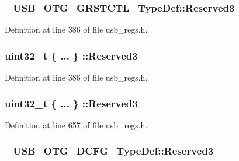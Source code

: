 \hypertarget{group___u_s_b___o_t_g___d_r_i_v_e_r_ga3ddb35024f1d6b9df8699e9471afda72}{
\subsubsection[{Reserved3}]{ \-\_\-\-U\-S\-B\-\_\-\-O\-T\-G\-\_\-\-G\-R\-S\-T\-C\-T\-L\-\_\-\-Type\-Def\-::\-Reserved3}}\label{group___u_s_b___o_t_g___d_r_i_v_e_r_ga3ddb35024f1d6b9df8699e9471afda72}


Definition at line 386 of file usb\-\_\-regs.\-h.

\hypertarget{group___u_s_b___o_t_g___d_r_i_v_e_r_gad0aeec0db612eae030b65cc000f7817a}{
\subsubsection[{Reserved3}]{\setlength{\rightskip}{0pt plus 5cm}uint32\-\_\-t \{ ... \} \-::Reserved3}}\label{group___u_s_b___o_t_g___d_r_i_v_e_r_gad0aeec0db612eae030b65cc000f7817a}


Definition at line 386 of file usb\-\_\-regs.\-h.

\hypertarget{group___u_s_b___o_t_g___d_r_i_v_e_r_ga5eb2b7eb0d418aef700fba2eac8b5886}{
\subsubsection[{Reserved3}]{\setlength{\rightskip}{0pt plus 5cm}uint32\-\_\-t \{ ... \} \-::Reserved3}}\label{group___u_s_b___o_t_g___d_r_i_v_e_r_ga5eb2b7eb0d418aef700fba2eac8b5886}


Definition at line 657 of file usb\-\_\-regs.\-h.

\hypertarget{group___u_s_b___o_t_g___d_r_i_v_e_r_ga96e0a6f3a74c064c783938a70f6c1cc4}{
\subsubsection[{Reserved3}]{ \-\_\-\-U\-S\-B\-\_\-\-O\-T\-G\-\_\-\-D\-C\-F\-G\-\_\-\-Type\-Def\-::\-Reserved3}}\label{group___u_s_b___o_t_g___d_r_i_v_e_r_ga96e0a6f3a74c064c783938a70f6c1cc4}


